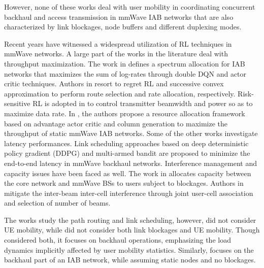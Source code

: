 However, none of these works deal with user mobility in coordinating concurrent backhaul and access transmission in mmWave IAB networks that are also characterized by link blockages, node buffers and different duplexing modes.


Recent years have witnessed a widespread utilization of RL techniques in mmWave networks.
A large part of the works in the literature deal with throughput maximization.
The work in \cite{lei2020deep} defines a spectrum allocation for IAB networks that maximizes the sum of log-rates through double DQN and actor critic techniques.
Authors in \cite{vu2018path} resort to regret RL and successive convex approximation to perform route selection and rate allocation, respectively.
Risk-sensitive RL is adopted in \cite{vu2018ultra} to control transmitter beamwidth and power so as to maximize data rate.
In \cite{zhang2021resource}, the authors propose a resource allocation framework based on advantage actor critic and column generation to maximize the throughput of static mmWave IAB networks.
Some of the other works investigate latency performances. Link scheduling approaches based on deep deterministic policy gradient (DDPG) \cite{gupta2020learning} and multi-armed bandit \cite{ortiz2019scaros} are proposed to minimize the end-to-end latency in mmWave backhaul networks.
Interference management and capacity issues have been faced as well. The work in \cite{feng2019dealing} allocates capacity between the core network and mmWave BSs to users subject to blockages. Authors in \cite{elsayed2020transfer} mitigate the inter-beam inter-cell interference through joint user-cell association and selection of number of beams.

The works \cite{vu2018path,zhang2021resource,gupta2020learning,ortiz2019scaros} study the path routing and link scheduling, however, \cite{zhang2021resource} did not consider UE mobility, while \cite{vu2018path,gupta2020learning} did not consider both link blockages and UE mobility.
Though \cite{ortiz2019scaros} considered both, it focuses on backhaul operations, emphasizing the load dynamics implicitly affected by user mobility statistics. Similarly, \cite{gupta2020learning} focuses on the backhaul part of an IAB network, while assuming static nodes and no blockages.


